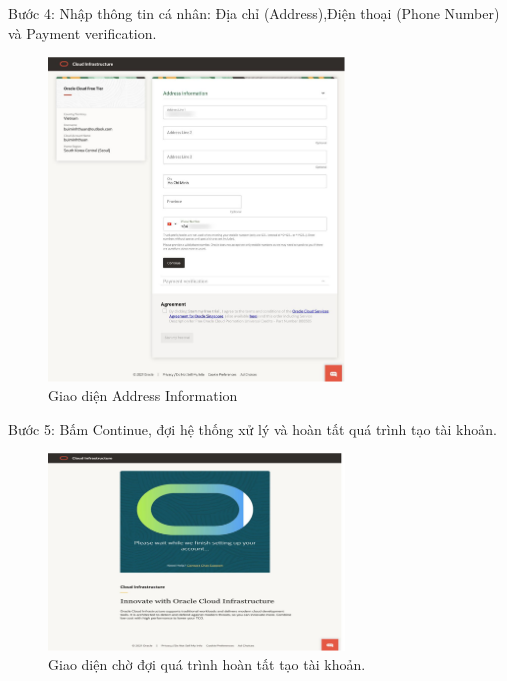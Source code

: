 \begin{myitem}
\item Bước 4: Nhập thông tin cá nhân: Địa chỉ (Address),Điện thoại (Phone Number) và Payment verification.

\begin{figure}[H] %
    \centering
    \includegraphics[width=0.7\textwidth]{Demo/Address_Information.png}
    \caption{Giao diện Address Information}
    \label{fig:cloud_intro}
\end{figure}

\item Bước 5: Bấm Continue, đợi hệ thống xử lý và hoàn tất quá trình tạo tài khoản.

\begin{figure}[H] %
    \centering
    \includegraphics[width=0.7\textwidth]{Demo/Cho_doi_hoan_tat.png}
    \caption{Giao diện chờ đợi quá trình hoàn tất tạo tài khoản.}
    \label{fig:cloud_intro}
\end{figure}

\end{myitem}

